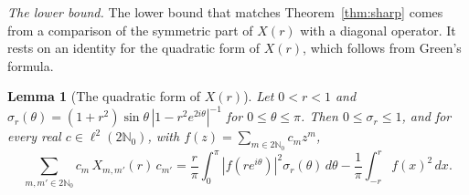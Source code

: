 \documentclass[11pt]{amsart}
\newtheorem{lemma}[theorem]{Lemma}
\theoremstyle{definition}
\theoremstyle{remark}
\numberwithin{equation}{section}
\newcommand{\N}{\mathbb{N}}
\begin{document}
\emph{The lower bound.} The lower bound that matches Theorem~\ref{thm:sharp} comes from a comparison of the symmetric part of $X(r)$ with a diagonal operator. It rests on an identity for the quadratic form of $X(r)$, which follows from Green's formula.

\begin{lemma}[The quadratic form of $X(r)$]\label{lem:qform}
Let $0<r<1$ and $\sigma_r(\theta)=(1+r^2)\sin\theta\,|1-r^2e^{2i\theta}|^{-1}$ for $0\le\theta\le\pi$. Then $0\le\sigma_r\le1$, and for every real $c\in\ell^2(2\N_0)$, with $f(z)=\sum_{m\in2\N_0}c_mz^m$,
\begin{equation}\label{eq:qform}
\sum_{m,m'\in2\N_0}c_m\,X_{m,m'}(r)\,c_{m'}=\frac r\pi\int_0^\pi|f(re^{i\theta})|^2\sigma_r(\theta)\,d\theta-\frac1\pi\int_{-r}^rf(x)^2\,dx .
\end{equation}
\end{lemma}
\end{document}
